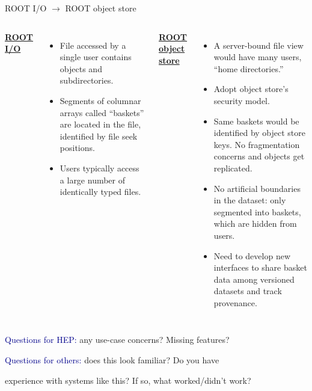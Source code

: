 \documentclass[aspectratio=169]{beamer}
\begin{document}
\begin{frame}{ROOT I/O $\to$ ROOT object store}
\vspace{0.35 cm}
\begin{columns}[t]
\underline{\large\bf ROOT I/O}

\vspace{0.2 cm}
\begin{itemize}
\item<1-> File accessed by a single user contains objects and subdirectories.

\vspace{\baselineskip}
\item<3-> Segments of columnar arrays called ``baskets'' are located in the file, identified by file seek positions.
\item<4-> Users typically access a large number of identically typed files.
\end{itemize}

\underline{\large\bf ROOT object store}

\vspace{0.2 cm}
\begin{itemize}
\item<1-> A server-bound file view would have many users, ``home directories.''
\item<2-> Adopt object store's security model.
\item<3-> Same baskets would be identified by object store keys. No fragmentation concerns and objects get replicated.
\item<4-> No artificial boundaries in the dataset: only segmented into baskets, which are hidden from users.
\item<5-> Need to develop new interfaces to share basket data among versioned datasets and track provenance.
\end{itemize}
\end{columns}
\end{frame}

\begin{frame}{}
\vspace{0.5 cm}
\Large

\textcolor{darkblue}{Questions for HEP:} any use-case concerns? Missing features?

\vspace{1 cm}
\textcolor{darkblue}{Questions for others:} does this look familiar? Do you have

\vspace{0.2 cm}
experience with systems like this? If so, what worked/didn't work?
\end{frame}
\end{document}
